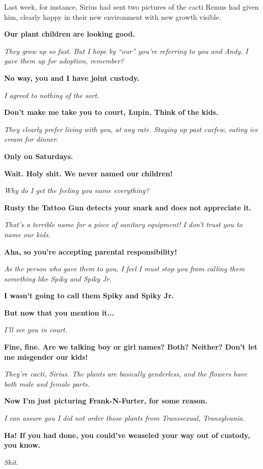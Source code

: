 Last week, for instance, Sirius had sent two pictures of the cacti Remus had given him, clearly happy in their new environment with new growth visible.

\textbf{Our plant children are looking good.
}

\textit{They grow up so fast. But I hope by “our” you’re referring to you and Andy. I gave them up for adoption, remember?
}

\textbf{No way, you and I have joint custody.
}

\textit{I agreed to nothing of the sort.
}

\textbf{Don’t make me take you to court, Lupin. Think of the kids.
}

\textit{They clearly prefer living with you, at any rate. Staying up past curfew, eating ice cream for dinner.
}

\textbf{Only on Saturdays.
}

\textbf{Wait. Holy shit. We never named our children!
}

\textit{Why do I get the feeling you name everything?
}

\textbf{Rusty the Tattoo Gun detects your snark and does not appreciate it.
}

\textit{That’s a terrible name for a piece of sanitary equipment! I don’t trust you to name our kids.
}

\textbf{Aha, so you’re accepting parental responsibility!}

\textit{As the person who gave them to you, I feel I must stop you from calling them something like Spiky and Spiky Jr.}

\textbf{I wasn’t going to call them Spiky and Spiky Jr.}

\textbf{But now that you mention it...}

\textit{I’ll see you in court.
}

\textbf{Fine, fine. Are we talking boy or girl names? Both? Neither? Don’t let me misgender our kids!
}

\textit{They’re cacti, Sirius. The plants are basically genderless, and the flowers have both male and female parts.
}

\textbf{Now I’m just picturing Frank-N-Furter, for some reason.
}

\textit{I can assure you I did not order those plants from Transsexual, Transylvania.
}

\textbf{Ha! If you had done, you could’ve weaseled your way out of custody, you know.
}

\textit{Shit}.

